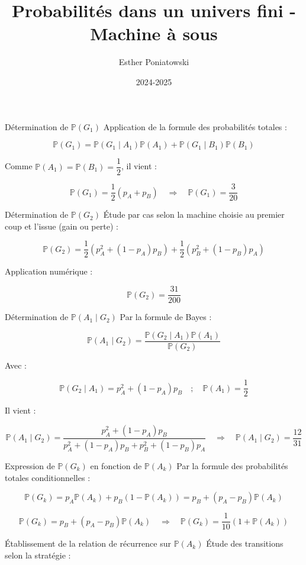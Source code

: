 \documentclass[10pt,a4paper]{article}
\title{Probabilités dans un univers fini - Machine à sous}
\author{Esther Poniatowski}
\date{2024-2025}
\begin{document}
\q Détermination de \( \mathbb{P}(G_1) \)
Application de la formule des probabilités totales :

\[
\mathbb{P}(G_1) = \mathbb{P}(G_1 \mid A_1) \mathbb{P}(A_1) + \mathbb{P}(G_1 \mid B_1) \mathbb{P}(B_1)
\]

Comme \( \mathbb{P}(A_1) = \mathbb{P}(B_1) = \dfrac{1}{2} \), il vient :

\[
\boxed{\mathbb{P}(G_1) = \dfrac{1}{2}(p_A + p_B)}
\quad \Rightarrow \quad \boxed{\mathbb{P}(G_1) = \dfrac{3}{20}}
\]


\q Détermination de \( \mathbb{P}(G_2) \)
Étude par cas selon la machine choisie au premier coup et l'issue (gain ou perte) :

\[
\mathbb{P}(G_2) = \dfrac{1}{2} \left( p_A^2 + (1 - p_A)p_B \right) + \dfrac{1}{2} \left( p_B^2 + (1 - p_B)p_A \right)
\]

Application numérique :

\[
\boxed{\mathbb{P}(G_2) = \dfrac{31}{200}}
\]


\q Détermination de \( \mathbb{P}(A_1 \mid G_2) \)
Par la formule de Bayes :

\[
\mathbb{P}(A_1 \mid G_2) = \dfrac{\mathbb{P}(G_2 \mid A_1) \mathbb{P}(A_1)}{\mathbb{P}(G_2)}
\]

Avec :

\[
\mathbb{P}(G_2 \mid A_1) = p_A^2 + (1 - p_A)p_B
\quad ; \quad
\mathbb{P}(A_1) = \dfrac{1}{2}
\]

Il vient :

\[
\boxed{\mathbb{P}(A_1 \mid G_2) = \dfrac{p_A^2 + (1 - p_A)p_B}{p_A^2 + (1 - p_A)p_B + p_B^2 + (1 - p_B)p_A}}
\quad \Rightarrow \quad \boxed{\mathbb{P}(A_1 \mid G_2) = \dfrac{12}{31}}
\]


\q Expression de \( \mathbb{P}(G_k) \) en fonction de \( \mathbb{P}(A_k) \)
Par la formule des probabilités totales conditionnelles :

\[
\mathbb{P}(G_k) = p_A \mathbb{P}(A_k) + p_B (1 - \mathbb{P}(A_k))
= p_B + (p_A - p_B) \mathbb{P}(A_k)
\]

\[
\boxed{\mathbb{P}(G_k) = p_B + (p_A - p_B) \mathbb{P}(A_k)}
\quad \Rightarrow \quad
\boxed{\mathbb{P}(G_k) = \dfrac{1}{10}(1 + \mathbb{P}(A_k))}
\]


\q Établissement de la relation de récurrence sur \( \mathbb{P}(A_k) \)
Étude des transitions selon la stratégie :
\end{document}
